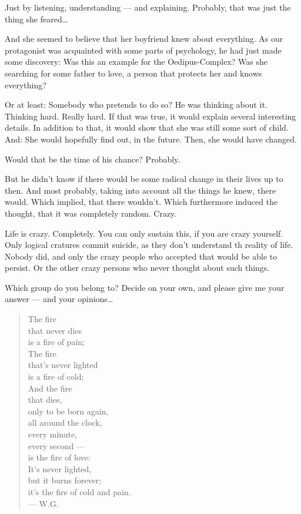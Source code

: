 Just by listening, understanding --- and explaining. 
Probably, that was just the thing she feared\ldots

And she seemed to believe that her boyfriend knew about everything. 
As our protagonist was acquainted with some parts of psychology, he had just made some discovery: Was this an example for the Oedipus-Complex? Was she searching for some father to love, a person that protects her and knows everything?

Or at least: Somebody who pretends to do so?
He was thinking about it. 
Thinking hard. 
Really hard. 
If that was true, it would explain several interesting details. 
In addition to that, it would show that she was still some sort of child. 
And: She would hopefully find out, in the future. 
Then, she would have changed.

Would that be the time of his chance?
Probably.

But he didn't know if there would be some radical change in their lives up to then. 
And most probably, taking into account all the things he knew, there would. 
Which implied, that there wouldn't. 
Which furthermore induced the thought, that it was completely random. 
Crazy.

Life is crazy. 
Completely. 
You can only sustain this, if you are crazy yourself. Only logical cratures commit suicide, as they don't understand th reality of life. 
Nobody did, and only the crazy people who accepted that would be able to persist. 
Or the other crazy persons who never thought about such things.

Which group do you belong to?
Decide on your own, and please give me your answer --- and your opinions\ldots

\begin{verse}
The fire \\
that never dies \\
is a fire of pain; \\
The fire \\
that's never lighted \\
is a fire of cold;\\
And the fire \\
that dies, \\
only to be born again, \\
all around the clock, \\
every minute, \\
every second --- \\
is the fire of love: \\
It's never lighted, \\
but it burns forever; \\
it's the fire of cold and pain. \\
--- W.G.
\end{verse}

